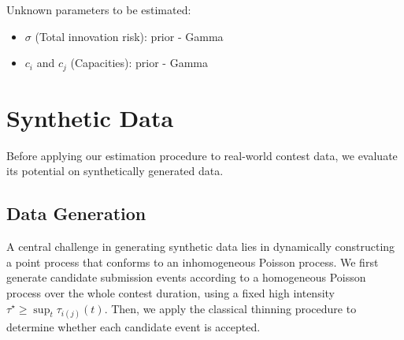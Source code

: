 \documentclass[mnsc]{informs3}
\begin{document}
Unknown parameters to be estimated: 
\begin{itemize}
	\item $\sigma$ (Total innovation risk): prior - Gamma
	\item $c_i$ and $c_j$ (Capacities): prior - Gamma
\end{itemize}



\section{Synthetic Data}

Before applying our estimation procedure to real-world contest data, we evaluate its potential on synthetically generated data.

\subsection{Data Generation}



A central challenge in generating synthetic data lies in dynamically constructing a point process that conforms to an inhomogeneous Poisson process.
We first generate candidate submission events according to a homogeneous Poisson process over the whole contest duration, using a fixed high intensity $\tau^\star \ge \sup_t \tau_{i(j)}(t)$.
Then, we apply the classical thinning procedure \citep{lewis1979simulation} to determine whether each candidate event is accepted.
\end{document}
